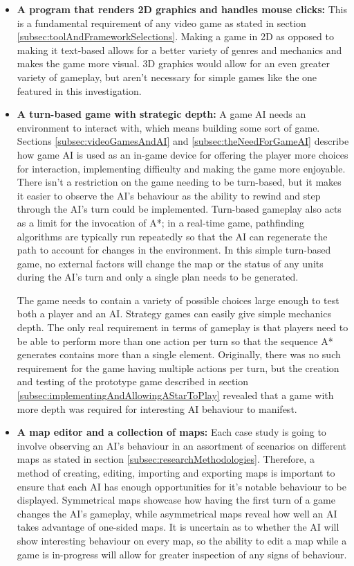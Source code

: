 \documentclass[11pt, a4paper]{report}
\begin{document}
\begin{itemize}

\item \textbf{A program that renders 2D graphics and handles mouse clicks:}
This is a fundamental requirement of any video game as stated in section \ref{subsec:toolAndFrameworkSelections}. Making a game in 2D as opposed to making it text-based allows for a better variety of genres and mechanics and makes the game more visual. 3D graphics would allow for an even greater variety of gameplay, but aren't necessary for simple games like the one featured in this investigation.

\item \textbf{A turn-based game with strategic depth:}
A game AI needs an environment to interact with, which means building some sort of game. Sections \ref{subsec:videoGamesAndAI} and \ref{subsec:theNeedForGameAI} describe how game AI is used as an in-game device for offering the player more choices for interaction, implementing difficulty and making the game more enjoyable. There isn't a restriction on the game needing to be turn-based, but it makes it easier to observe the AI's behaviour as the ability to rewind and step through the AI's turn could be implemented. Turn-based gameplay also acts as a limit for the invocation of A*; in a real-time game, pathfinding algorithms are typically run repeatedly so that the AI can regenerate the path to account for changes in the environment. In this simple turn-based game, no external factors will change the map or the status of any units during the AI's turn and only a single plan needs to be generated. 

The game needs to contain a variety of possible choices large enough to test both a player and an AI. Strategy games can easily give simple mechanics depth. The only real requirement in terms of gameplay is that players need to be able to perform more than one action per turn so that the sequence A* generates contains more than a single element. Originally, there was no such requirement for the game having multiple actions per turn, but the creation and testing of the prototype game described in section \ref{subsec:implementingAndAllowingAStarToPlay} revealed that a game with more depth was required for interesting AI behaviour to manifest.

\item \textbf{A map editor and a collection of maps:}
Each case study is going to involve observing an AI's behaviour in an assortment of scenarios on different maps as stated in section \ref{subsec:researchMethodologies}. Therefore, a method of creating, editing, importing and exporting maps is important to ensure that each AI has enough opportunities for it's notable behaviour to be displayed. Symmetrical maps showcase how having the first turn of a game changes the AI's gameplay, while asymmetrical maps reveal how well an AI takes advantage of one-sided maps. It is uncertain as to whether the AI will show interesting behaviour on every map, so the ability to edit a map while a game is in-progress will allow for greater inspection of any signs of behaviour.


\end{itemize}
\end{document}
